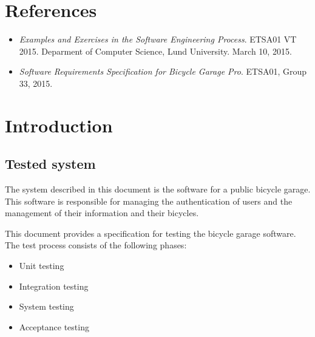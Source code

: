\documentclass[12pt,titlepage]{article}
\begin{document}


\maketitle
\newpage
\tableofcontents
\thispagestyle{empty}
\setcounter{page}{0}
\newpage


\section{References}
\label{sec:references}

\begin{itemize}
	\item \textit{Examples and Exercises in the Software
		Engineering Process}. ETSA01 VT 2015. Deparment of Computer Science, Lund
		University. March 10, 2015.
	\item \textit{Software Requirements Specification for Bicycle Garage
		Pro}. ETSA01, Group 33, 2015.
\end{itemize}


\section{Introduction}
\label{sec:introduction}

\subsection{Tested system}
\label{subsec:tested-system}

The system described in this document is the software for a public bicycle
garage. This software is responsible for managing the authentication of users
and the management of their information and their bicycles.

This document provides a specification for testing the bicycle garage software.
The test process consists of the following phases:

\begin{itemize}
	\item Unit testing
	\item Integration testing
	\item System testing
	\item Acceptance testing
\end{itemize}
\end{document}

